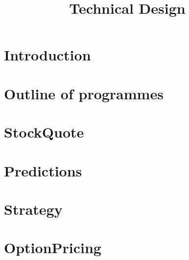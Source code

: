 \documentclass[12pt,a4paper,titlepage]{article}
\title {Technical Design}
\begin{document}
\maketitle
\section{Introduction}

\section{Outline of programmes}
\section{StockQuote}
\section{Predictions}
\section{Strategy}
\section{OptionPricing}
%
\end{document}
